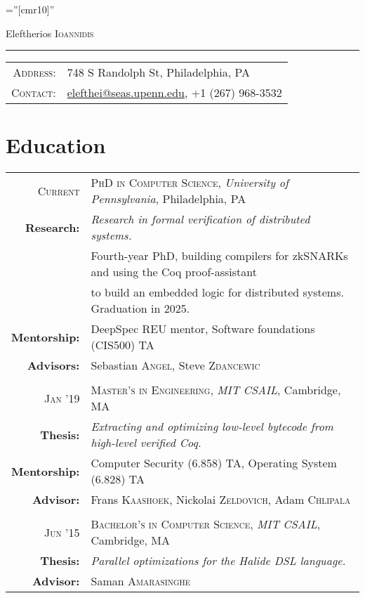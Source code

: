 \documentclass[lettersize,11pt]{article}
\begin{document}
\pagestyle{empty} %
\font\fb=''[cmr10]'' %

\par{\centering
		{\Huge Eleftherios \textsc{Ioannidis}
	}
	\bigskip\par}

\hrule
\begin{tabular}{rl}
    \textsc{Address:}   & 748 S Randolph St, Philadelphia, PA \\
    \textsc{Contact:}   & \href{mailto:elefthei@seas.upenn.edu}{elefthei@seas.upenn.edu}, +1 (267) 968-3532 \\
\end{tabular}

\section{Education}
\begin{tabular}{rl}
\textsc{Current} & \textsc{PhD in Computer Science}, \emph{University of Pennsylvania}, Philadelphia, PA\\
\textbf{Research:} & \emph{Research in formal verification of distributed systems.}\\
& Fourth-year PhD, building compilers for zkSNARKs and using the Coq proof-assistant \\
& to build an embedded logic for distributed systems. Graduation in 2025. \\
\textbf{Mentorship:} & DeepSpec REU mentor, Software foundations (CIS500) TA \\
\textbf{Advisors:} & Sebastian \textsc{Angel}, Steve \textsc{Zdancewic}\\
 & \\[-0.5em]
\textsc{Jan} '19 & \textsc{Master's in Engineering}, \emph{MIT} \emph{CSAIL}, Cambridge, MA\\
\textbf{Thesis:} & \emph{Extracting and optimizing low-level bytecode from high-level verified Coq.}\\
\textbf{Mentorship:} & Computer Security (6.858) TA, Operating System (6.828) TA \\
\textbf{Advisor:} & Frans \textsc{Kaashoek}, Nickolai \textsc{Zeldovich}, Adam \textsc{Chlipala}\\
 & \\[-0.5em]
\textsc{Jun} '15 & \textsc{Bachelor's in Computer Science}, \emph{MIT} \emph{CSAIL}, Cambridge, MA\\
\textbf{Thesis:} & \emph{Parallel optimizations for the Halide DSL language.}\\
\textbf{Advisor:} & Saman \textsc{Amarasinghe}\\
\end{tabular}
\end{document}

